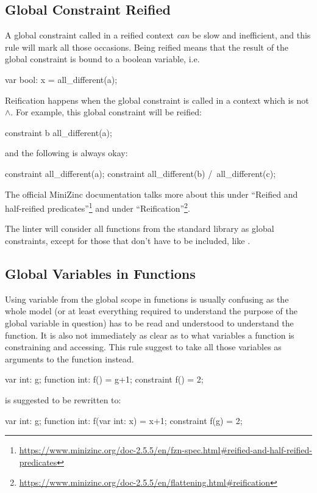 \documentclass[a4paper,12pt]{article}
\newcommand{\mi}[1]{\mbox{\mzninline{#1}}}
\begin{document}
\subsection{Global Constraint Reified}\label{sec:rule:reifiedglobal}
A global constraint called in a reified context \emph{can} be slow and inefficient,
and this rule will mark all those occasions. Being reified means that the result of the global
constraint is bound to a boolean variable, i.e.\@
\begin{mznnobreak}
var bool: x = all_different(a);
\end{mznnobreak}
Reification happens when the global constraint is called in a context which is not $\land$.
For example, this global constraint will be reified:
\begin{mznnobreak}
constraint b \/ all_different(a);
\end{mznnobreak}
and the following is always okay:
\begin{mznnobreak}
constraint all_different(a);
constraint all_different(b) /\ all_different(c);
\end{mznnobreak}
The official MiniZinc documentation talks more about this under ``Reified and half-reified
predicates''\footnote{\url{https://www.minizinc.org/doc-2.5.5/en/fzn-spec.html\#reified-and-half-reified-predicates}}
and under ``Reification''\footnote{\url{https://www.minizinc.org/doc-2.5.5/en/flattening.html\#reification}}.

The linter will consider all functions from the standard library as global constraints,
except for those that don't have to be included, like \mi{forall}.

\subsection{Global Variables in Functions}\label{sec:rule:blobalfun}
Using variable from the global scope in functions is usually confusing as the whole model
(or at least everything required to understand the purpose of the global variable in
question) has to be read and understood to understand the function. It is also not
immediately as clear as to what variables a function is constraining and accessing. This rule
suggest to take all those variables as arguments to the function instead.

\begin{mznnobreak}
var int: g;
function int: f() = g+1;
constraint f() = 2;
\end{mznnobreak}
is suggested to be rewritten to:
\begin{mznnobreak}
var int: g;
function int: f(var int: x) = x+1;
constraint f(g) = 2;
\end{mznnobreak}
\end{document}

